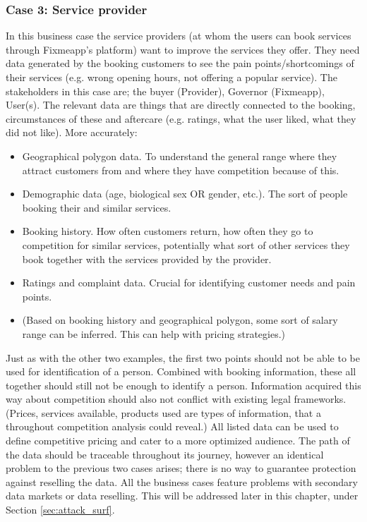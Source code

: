 \documentclass[english, 12pt, a4paper, sci, utf8, a-2b, online]{aaltothesis}
\theoremstyle{change}
\theoremstyle{theoremstyle}
\begin{document}
\subsubsection{Case 3: Service provider}
In this business case the service providers (at whom the users can book services through Fixmeapp's platform) want to improve the services they offer. They need data generated by the booking customers to see the pain points/shortcomings of their services (e.g. wrong opening hours, not offering a popular service).
The stakeholders in this case are; the buyer (Provider), Governor (Fixmeapp), User(s). The relevant data are things that are directly connected to the booking, circumstances of these and aftercare (e.g. ratings, what the user liked, what they did not like). More accurately:
\begin{itemize}
    \item Geographical polygon data. To understand the general range where they attract customers from and where they have competition because of this.
    \item Demographic data (age, biological sex OR gender, etc.). The sort of people booking their and similar services.
    \item Booking history. How often customers return, how often they go to competition for similar services, potentially what sort of other services they book together with the services provided by the provider.
    \item Ratings and complaint data. Crucial for identifying customer needs and pain points.
    \item (Based on booking history and geographical polygon, some sort of salary range can be inferred. This can help with pricing strategies.)
\end{itemize}
Just as with the other two examples, the first two points should not be able to be used for identification of a person. Combined with booking information, these all together should still not be enough to identify a person. Information acquired this way about competition should also not conflict with existing legal frameworks. (Prices, services available, products used are types of information, that a throughout competition analysis could reveal.) All listed data can be used to define competitive pricing and cater to a more optimized audience. The path of the data should be traceable throughout its journey, however an identical problem to the previous two cases arises; there is no way to guarantee protection against reselling the data.
All the business cases feature problems with secondary data markets or data reselling. This will be addressed later in this chapter, under Section \ref{sec:attack_surf}.
\end{document}
